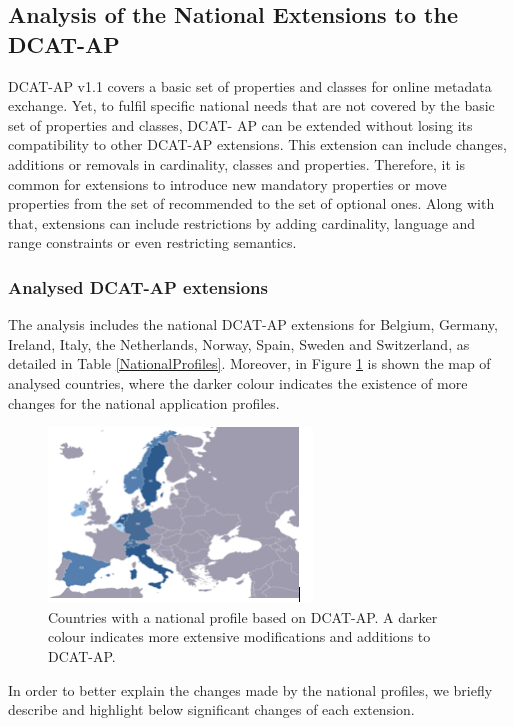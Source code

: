 \documentclass[<options>]{elsarticle}
\begin{document}
\subsection{Analysis of the National Extensions to the DCAT-AP} \label{NationalExtensions}
DCAT-AP v1.1 covers a basic set of properties and classes for online metadata exchange. Yet, to fulfil specific national needs that are not covered by the basic set of properties and classes, DCAT- AP can be extended without losing its compatibility to other DCAT-AP extensions. This extension can include changes, additions or removals in cardinality, classes and properties. Therefore, it is common for extensions to introduce new mandatory properties or move properties from the set of recommended to the set of optional ones. Along with that, extensions can include restrictions by adding cardinality, language and range constraints or even restricting semantics.

\subsubsection{Analysed DCAT-AP extensions}
The analysis includes the national DCAT-AP extensions for Belgium, Germany, Ireland, Italy, the Netherlands, Norway, Spain, Sweden and Switzerland, as detailed in Table \ref{NationalProfiles}. Moreover, in Figure \ref{CountriesNationalProfile} is shown the map of analysed countries, where the darker colour indicates the existence of more changes for the national application profiles. 

\begin{figure}[H]
\includegraphics{replace2.png}
\caption{Countries with a national profile based on DCAT-AP. A darker colour indicates more extensive modifications and additions to DCAT-AP.}
\label{CountriesNationalProfile}
\end{figure}

In order to better explain the changes made by the national profiles, we briefly describe and highlight below significant changes of each extension.
\end{document}
